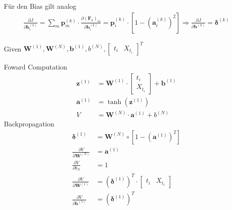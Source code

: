 \documentclass[a4paper, 12pt]{scrartcl}
\begin{document}
Für den Bias gilt analog 
%
\begin{align*}
    \frac{\partial J}{\partial \bm{b}_{i}^{(k)}}
    =
    \sum_{m} \bm{p}_m^{(k)} \cdot 
    \frac{\partial (\bm{F}_k)_m}{\partial \bm{b}_{i}^{(k)}}
    =
    \bm{p}_i^{(k)} \cdot
    \left[
        1 - 
        \left(
            \bm{a}_i^{(k)}
        \right)^2
    \right]
    \Rightarrow
    \frac{\partial J}{\partial \bm{b}^{(k)}} = \bm{\delta}^{(k)}
\end{align*}

\begin{algorithm}
    \caption{Backpropagation in Neural Networks $1$ Hidden-Layers}
    \begin{algorithmic}
        \State Given $\bm{W}^{(1)}, \bm{W}^{(N)} , \bm{b}^{(1)}, b^{(N)}, 
        \begin{bmatrix} t_i & X_{t_i} \end{bmatrix}^T$ 

        \State Foward Computation
        \begin{align*}
            \bm{z}^{(1)} &= \bm{W}^{(1)} \cdot 
            \begin{bmatrix}
                t_i \\
                X_{t_i}
            \end{bmatrix}
            + 
            \bm{b}^{(1)}
            \\
            \bm{a}^{(1)} &= \tanh\left(\bm{z}^{(1)}\right)
            \\
            V 
            &=
            \bm{W}^{(N)} \cdot \bm{a}^{(1)} + b^{(N)}
        \end{align*}
        \State Backpropagation
        \begin{align*}
            \bm{\delta}^{(1)} &=
            \bm{W}^{(N)} \circ 
            \left[
                1 - \left( \bm{a}^{(1)} \right)^2
            \right]
            \\
            \frac{\partial V}{\partial \bm{W}^{(N)}}
            &=
            \bm{a}^{(1)}
            \\
            \frac{\partial V}{\partial b_N} 
            &= 1
            \\
            \frac{\partial V}{\partial \bm{W}^{(1)}}
            &=
            \left(\bm{\delta}^{(1)} \right)^T
            \cdot
            \begin{bmatrix}
                t_i & X_{t_i}
            \end{bmatrix}
            \\
            \frac{\partial V}{\partial \bm{b}^{(1)}}
            &=
            \left(\bm{\delta}^{(1)} \right)^T
        \end{align*}


\end{algorithmic}
\end{algorithm}
\end{document}
